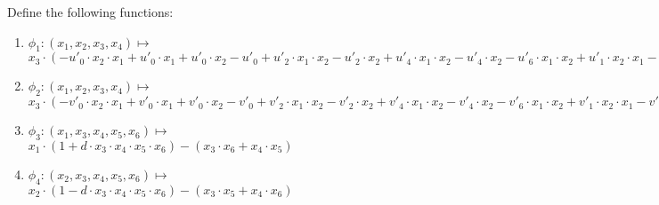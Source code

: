 Define the following functions:
\begin{enumerate}
    \item $\phi_1: (x_1, x_2, x_3, x_4) \mapsto $ \\
        $x_3 \cdot (-u'_0 \cdot x_2 \cdot x_1 + u'_0 \cdot x_1 + u'_0 \cdot x_2
        - u'_0 + u'_2 \cdot x_1 \cdot x_2 - u'_2\cdot x_2 + u'_4 \cdot x_1 \cdot x_2
        - u'_4\cdot x_2 -u'_6 \cdot x_1 \cdot x_2 + u'_1 \cdot x_2 \cdot x_1
        - u'_1 \cdot x_1 - u'_1 \cdot x_2 + u'_1  - u'_3 \cdot x_1 \cdot x_2 + u'_3\cdot x_2
        - u'_5 \cdot x_1 \cdot x_2 + u'_5\cdot x_2 + u'_7 \cdot x_1 \cdot x_2) -
        (x_4 - u'_0 \cdot x_2 \cdot x_1 + u'_0 \cdot x_1 + u'_0 \cdot x_2
        - u'_0 + u'_2 \cdot x_1 \cdot x_2 - u'_2\cdot x_2 + u'_4 \cdot x_1 \cdot x_2
        - u'_4\cdot x_2 -u'_6 \cdot x_1 \cdot x_2)$
    \item $\phi_2: (x_1, x_2, x_3, x_4) \mapsto $ \\
        $x_3 \cdot (-v'_0 \cdot x_2 \cdot x_1 + v'_0 \cdot x_1 + v'_0 \cdot x_2
        - v'_0 + v'_2 \cdot x_1 \cdot x_2 -v'_2 \cdot x_2 + v'_4 \cdot x_1 \cdot x_2
        - v'_4 \cdot x_2 - v'_6 \cdot x_1 \cdot x_2 + v'_1 \cdot x_2 \cdot x_1
        - v'_1 \cdot x_1 - v'_1 \cdot x_2 + v'_1  - v'_3 \cdot x_1 \cdot x_2
        + v'_3 \cdot x_2 - v'_5 \cdot x_1 \cdot x_2 + v'_5 \cdot x_2
        + v'_7 \cdot x_1 \cdot x_2) - (x_4 - v'_0 \cdot x_2 \cdot x_1
        + v'_0 \cdot x_1 + v'_0 \cdot x_2 - v'_0 + v'_2 \cdot x_1 \cdot x_2
        - v'_2 \cdot x_2 + v'_4 \cdot x_1 \cdot x_2 - v'_4 \cdot x_2 - v'_6 \cdot x_1 \cdot x_2) $
    \item $\phi_3: (x_1, x_3, x_4, x_5, x_6) \mapsto $ \\
        $x_1 \cdot (1 + d \cdot x_3 \cdot x_4 \cdot x_5 \cdot x_6)
        - (x_3 \cdot x_6 + x_4 \cdot x_5)$
    \item $\phi_4: (x_2, x_3, x_4, x_5, x_6) \mapsto $ \\
        $x_2 \cdot (1 - d \cdot x_3 \cdot x_4 \cdot x_5 \cdot x_6) - (x_3 \cdot x_5 + x_4 \cdot x_6)$
\end{enumerate}


